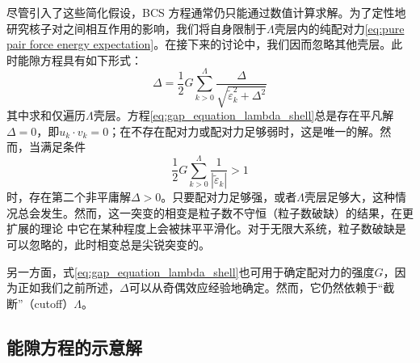 尽管引入了这些简化假设，BCS 方程通常仍只能通过数值计算求解。为了定性地研究核子对之间相互作用的影响，我们将自身限制于$\Lambda$壳层内的纯配对力\ref{eq:pure pair force energy expectation}。在接下来的讨论中，我们因而忽略其他壳层。此时能隙方程具有如下形式：
\begin{equation}
\Delta=\frac{1}{2}G\sum^{\Lambda}_{k>0}\frac{\Delta}{\sqrt{\tilde{\varepsilon}^{2}_{k}+\Delta^{2}}}\label{eq:gap_equation_lambda_shell}
\end{equation}
其中求和仅遍历$\Lambda$壳层。方程\ref{eq:gap_equation_lambda_shell}总是存在平凡解$\Delta=0$，即$u_{k}\cdot v_{k}=0$；在不存在配对力或配对力足够弱时，这是唯一的解。然而，当满足条件
\begin{equation}
\frac{1}{2}G\sum^{\Lambda}_{k>0}\frac{1}{|\tilde{\varepsilon}_{k}|}>1\label{eq:nontrivial_gap_condition}
\end{equation}
时，存在第二个非平庸解$\Delta>0$。只要配对力足够强，或者$\Lambda$壳层足够大，这种情况总会发生。然而，这一突变的相变是粒子数不守恒（粒子数破缺）的结果，在更扩展的理论
\cite{MPR65} 中它在某种程度上会被抹平平滑化。对于无限大系统，粒子数破缺是可以忽略的，此时相变总是尖锐突变的。

另一方面，式\ref{eq:gap_equation_lambda_shell}也可用于确定配对力的强度$G$，因为正如我们之前所述，$\Delta$可以从奇偶效应经验地确定。然而，它仍然依赖于“截断”（cutoff）$\Lambda$。

\subsection{能隙方程的示意解\label{subsec:=0080FD=009699=0065B9=007A0B=007684=00793A=00610F=0089E3}}

